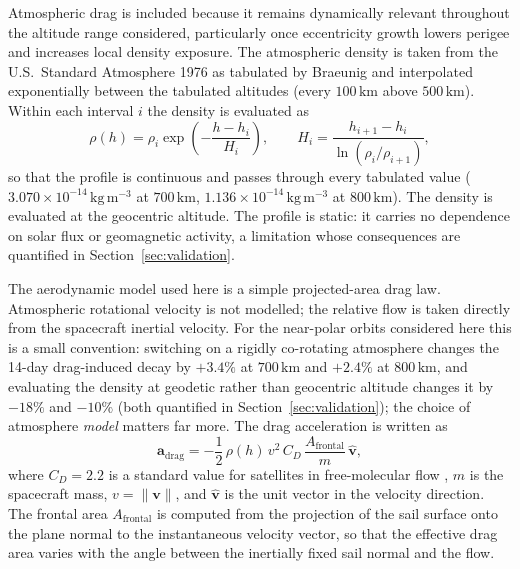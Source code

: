 \par\noindent Atmospheric drag is included because it remains dynamically relevant throughout the altitude range considered, particularly once eccentricity growth lowers perigee and increases local density exposure. The atmospheric density is taken from the U.S.\ Standard Atmosphere 1976 \citep{USSA1976} as tabulated by Braeunig \citep{braeunig_atmos} and interpolated exponentially between the tabulated altitudes (every \(100\,\mathrm{km}\) above \(500\,\mathrm{km}\)). Within each interval \(i\) the density is evaluated as
\begin{equation}
\rho(h) = \rho_i \exp\left(-\frac{h - h_i}{H_i}\right),\qquad
H_i = \frac{h_{i+1}-h_i}{\ln\left(\rho_i/\rho_{i+1}\right)},
\label{eq:atmospheric_density}
\end{equation}
so that the profile is continuous and passes through every tabulated value (\(3.070\times10^{-14}\,\mathrm{kg\,m^{-3}}\) at \(700\,\mathrm{km}\), \(1.136\times10^{-14}\,\mathrm{kg\,m^{-3}}\) at \(800\,\mathrm{km}\)). The density is evaluated at the geocentric altitude. The profile is static: it carries no dependence on solar flux or geomagnetic activity, a limitation whose consequences are quantified in Section~\ref{sec:validation}.

\vspace{5pt}
\par\noindent The aerodynamic model used here is a simple projected-area drag law. Atmospheric rotational velocity is not modelled; the relative flow is taken directly from the spacecraft inertial velocity. For the near-polar orbits considered here this is a small convention: switching on a rigidly co-rotating atmosphere changes the 14-day drag-induced decay by \(+3.4\%\) at \(700\,\mathrm{km}\) and \(+2.4\%\) at \(800\,\mathrm{km}\), and evaluating the density at geodetic rather than geocentric altitude changes it by \(-18\%\) and \(-10\%\) (both quantified in Section~\ref{sec:validation}); the choice of atmosphere \emph{model} matters far more. The drag acceleration is written as
\begin{equation}
\mathbf{a}_{\mathrm{drag}} =
-\frac{1}{2}\,\rho(h)\,v^{2}\,C_D\,\frac{A_{\mathrm{frontal}}}{m}\,\hat{\mathbf{v}},
\label{eq:drag_force}
\end{equation}
where \(C_D=2.2\) is a standard value for satellites in free-molecular flow \citep{vallado2007}, \(m\) is the spacecraft mass, \(v = \|\mathbf{v}\|\), and \(\hat{\mathbf{v}}\) is the unit vector in the velocity direction. The frontal area \(A_{\mathrm{frontal}}\) is computed from the projection of the sail surface onto the plane normal to the instantaneous velocity vector, so that the effective drag area varies with the angle between the inertially fixed sail normal and the flow.



